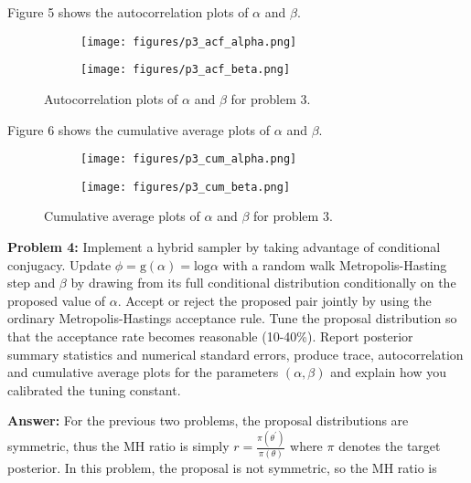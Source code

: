 \documentclass[12pt]{article}
\begin{document}
Figure 5 shows the autocorrelation plots of $\alpha$ and $\beta$.

\begin{figure}[H]
\begin{subfigure}{.5\textwidth}
  \centering
  \texttt{[image: figures/p3\_acf\_alpha.png]}
\end{subfigure}
\begin{subfigure}{.5\textwidth}
  \centering
  \texttt{[image: figures/p3\_acf\_beta.png]}
\end{subfigure}
\caption{Autocorrelation plots of $\alpha$ and $\beta$ for problem 3.}
\end{figure}

Figure 6 shows the cumulative average plots of $\alpha$ and $\beta$.

\begin{figure}[H]
\begin{subfigure}{.5\textwidth}
  \centering
  \texttt{[image: figures/p3\_cum\_alpha.png]}
\end{subfigure}
\begin{subfigure}{.5\textwidth}
  \centering
  \texttt{[image: figures/p3\_cum\_beta.png]}
\end{subfigure}
\caption{Cumulative average plots of $\alpha$ and $\beta$ for problem 3.}
\end{figure}

\vspace{10mm}

\textbf{Problem 4:} Implement a hybrid sampler by taking advantage of conditional conjugacy. Update $\phi = \text{g}(\alpha) = \text{log} \alpha$ with a random walk Metropolis-Hasting step and $\beta$ by drawing from its full conditional distribution conditionally on the proposed value of $\alpha$. Accept or reject the proposed pair jointly by using the ordinary Metropolis-Hastings acceptance rule. Tune the proposal distribution so that the acceptance rate becomes reasonable (10-40\%). Report posterior summary statistics and numerical standard errors, produce trace, autocorrelation and cumulative average plots for the parameters  $(\alpha, \beta)$ and explain how you calibrated the tuning constant.

\vspace{5mm}

\textbf{Answer:} For the previous two problems, the proposal distributions are symmetric, thus the MH ratio is simply $r=\frac{\pi(\theta^{\prime})}{\pi(\theta)}$ where $\pi$ denotes the target posterior. In this problem, the proposal is not symmetric, so the MH ratio is
\end{document}
